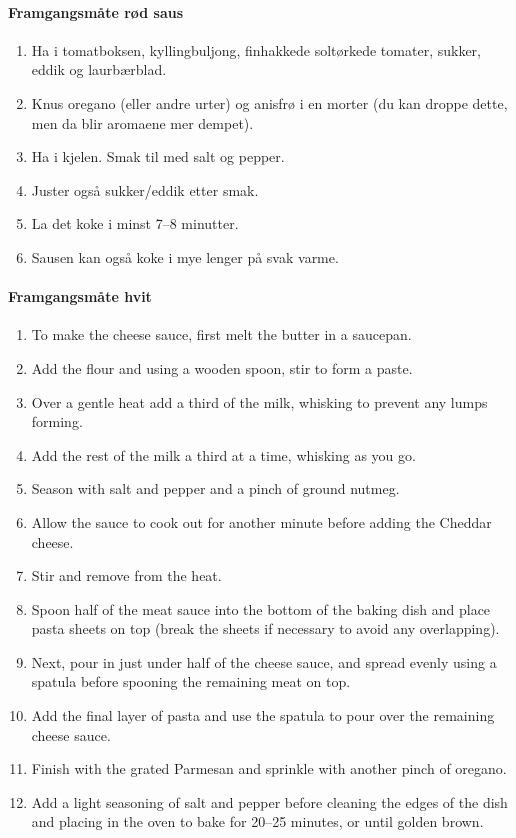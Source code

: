 \documentclass[12pt,a4paper]{book}
\begin{document}
\paragraph{Framgangsmåte rød saus}
\begin{enumerate}[noitemsep]
	\item Ha i tomatboksen, kyllingbuljong, finhakkede soltørkede tomater, sukker, eddik og laurbærblad.
	\item Knus oregano (eller andre urter) og anisfrø i en morter (du kan droppe dette, men da blir aromaene mer dempet).
	\item Ha i kjelen. Smak til med salt og pepper.
	\item Juster også sukker/eddik etter smak.
	\item La det koke i minst 7--8 minutter.
	\item Sausen kan også koke i mye lenger på svak varme.
	\end{enumerate}

	\paragraph{Framgangsmåte hvit}
	\begin{enumerate}[noitemsep]
	\item To make the cheese sauce, first melt the butter in a saucepan.
	\item Add the flour and using a wooden spoon, stir to form a paste.
	\item Over a gentle heat add a third of the milk, whisking to prevent any lumps forming.
	\item Add the rest of the milk a third at a time, whisking as you go.
	\item Season with salt and pepper and a pinch of ground nutmeg.
	\item Allow the sauce to cook out for another minute before adding the Cheddar cheese.
	\item Stir and remove from the heat.
	\item Spoon half of the meat sauce into the bottom of the baking dish and place pasta sheets on top (break the sheets if necessary to avoid any overlapping).
	\item Next, pour in just under half of the cheese sauce, and spread evenly using a spatula before spooning the remaining meat on top.
	\item Add the final layer of pasta and use the spatula to pour over the remaining cheese sauce.
	\item Finish with the grated Parmesan and sprinkle with another pinch of oregano.
	\item Add a light seasoning of salt and pepper before cleaning the edges of the dish and placing in the oven to bake for 20--25 minutes, or until golden brown.
\end{enumerate}
\end{document}
